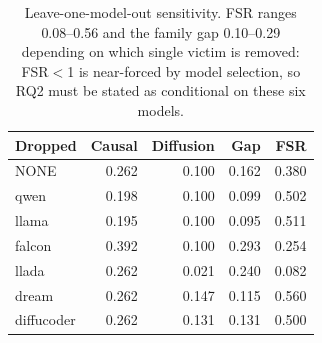 \begin{table}[t]
\centering
\small
\begin{tabular}{lrrrr}
\toprule
Dropped & Causal & Diffusion & Gap & FSR \\
\midrule
NONE & 0.262 & 0.100 & 0.162 & 0.380 \\
qwen & 0.198 & 0.100 & 0.099 & 0.502 \\
llama & 0.195 & 0.100 & 0.095 & 0.511 \\
falcon & 0.392 & 0.100 & 0.293 & 0.254 \\
llada & 0.262 & 0.021 & 0.240 & 0.082 \\
dream & 0.262 & 0.147 & 0.115 & 0.560 \\
diffucoder & 0.262 & 0.131 & 0.131 & 0.500 \\
\bottomrule
\end{tabular}
\caption{Leave-one-model-out sensitivity. FSR ranges 0.08--0.56 and the family gap 0.10--0.29 depending on which single victim is removed: FSR$<$1 is near-forced by model selection, so RQ2 must be stated as conditional on these six models.}
\label{tab:lomo}
\end{table}
